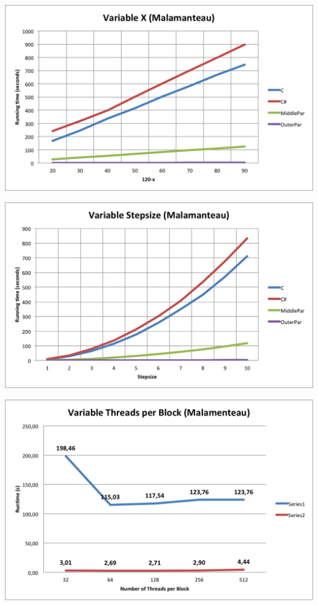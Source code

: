 \centerline{\includegraphics[width=\textwidth]{img/Malamanteau-varx.png}}

\centerline{\includegraphics[width=\textwidth]{img/Malamanteau-stepsize.png}}

\centerline{\includegraphics[width=\textwidth]{img/Malamanteau-tpb.png}}

